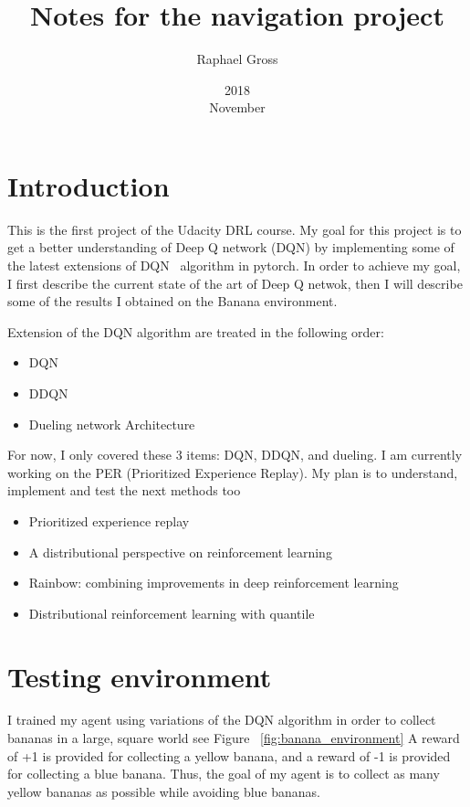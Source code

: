 \documentclass[12pt]{article}
\begin{document}
\title{Notes for the navigation project}
\date{2018\\ November}
\author{Raphael Gross}
\maketitle




\section{Introduction}
This is the first project of the Udacity DRL course. My goal for this project is to get a better understanding of Deep Q network (DQN) by implementing some of the latest extensions of DQN~\cite{mnih2015humanlevel} algorithm in pytorch. In order to achieve my goal, I first describe the current state of the art of Deep Q netwok, then I will describe some of the results I obtained on the Banana environment.

Extension of the DQN  algorithm are treated in the following order:

\begin{itemize}
\item DQN~\cite{mnih2015humanlevel}
\item DDQN~\cite{Hasselt2016}
\item Dueling network Architecture~\cite{BellemareDM17}
\end{itemize}


For now, I only covered these 3 items: DQN, DDQN, and dueling. I am currently working on the PER (Prioritized Experience Replay). My plan is to understand, implement and test the next methods too

\begin{itemize}
\item Prioritized experience replay
\item A distributional perspective on reinforcement learning
\item Rainbow: combining improvements in deep reinforcement learning 
\item Distributional reinforcement learning with quantile 
\end{itemize}

\section{Testing environment}
I trained my agent using  variations of the DQN algorithm in order to collect bananas in a large, square world see Figure ~\ref{fig:banana_environment}
A reward of +1 is provided for collecting a yellow banana, and a reward of -1 is provided for collecting a blue banana. Thus, the goal of my agent is to collect as many yellow bananas as possible while avoiding blue bananas.
\end{document}
